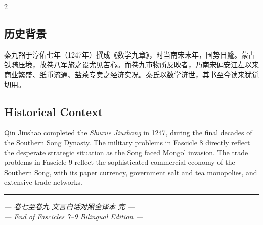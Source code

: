 \documentclass[11pt,a4paper]{article}
\newcommand{\longline}{\noindent\rule{\textwidth}{0.4pt}}
\begin{document}
\vspace{1em}
\begin{paracol}{2}
\subsection*{历史背景}

秦九韶于淳佑七年（1247年）撰成《数学九章》，时当南宋末年，国势日蹙。蒙古铁骑压境，故卷八军旅之设尤见苦心。而卷九市物所反映者，乃南宋偏安江左以来商业繁盛、纸币流通、盐茶专卖之经济实况。秦氏以数学济世，其书至今读来犹觉切用。
\switchcolumn
\subsection*{Historical Context}

Qin Jiushao completed the \textit{Shuxue Jiuzhang} in 1247, during the final decades of the Southern Song Dynasty. The military problems in Fascicle 8 directly reflect the desperate strategic situation as the Song faced Mongol invasion. The trade problems in Fascicle 9 reflect the sophisticated commercial economy of the Southern Song, with its paper currency, government salt and tea monopolies, and extensive trade networks.
\end{paracol}

\vspace{2em}
\begin{center}
\longline
\vspace{1em}
{\small\color{sectioncolor}
\textit{--- 卷七至卷九 文言白话对照全译本 完 ---}\\
\textit{--- End of Fascicles 7--9 Bilingual Edition ---}
}
\end{center}
\end{document}

